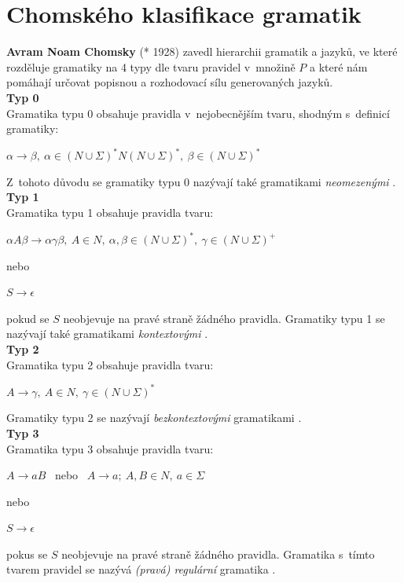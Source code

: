 \section{Chomského klasifikace gramatik} \label{sec:2:chomsky}
\textbf{Avram Noam Chomsky} (* 1928) zavedl hierarchii gramatik a jazyků, ve které rozděluje gramatiky na 4 typy dle tvaru pravidel v~množině 
$P$ a které nám pomáhají určovat popisnou a rozhodovací sílu generovaných jazyků. \\

\textbf{Typ 0} \\
Gramatika typu 0 obsahuje pravidla v~nejobecnějším tvaru, shodným s~definicí gramatiky:
\begin{center}
$\alpha \rightarrow \beta, \ \alpha \in (N \cup \Sigma)^*N(N \cup \Sigma)^*, \ \beta \in (N \cup \Sigma)^*$
\end{center}
Z~tohoto důvodu se gramatiky typu 0 nazývají také gramatikami \textit{neomezenými} \cite[str. 16]{TIN2013}. \\
\newpage
\textbf{Typ 1} \\
Gramatika typu 1 obsahuje pravidla tvaru:
\begin{center}
$ \alpha A \beta \rightarrow \alpha\gamma\beta, \ A \in N, \ \alpha, \beta \in (N \cup \Sigma)^*, \ \gamma \in (N \cup \Sigma)^+$ 
\end{center}
nebo
\begin{center}
$ S \rightarrow \epsilon$ 
\end{center}
pokud se $S$ neobjevuje na pravé straně žádného pravidla. Gramatiky typu 1 se nazývají také gramatikami 
\textit{kontextovými} \cite[str. 16]{TIN2013}. \\

\textbf{Typ 2} \\
Gramatika typu 2 obsahuje pravidla tvaru:
\begin{center}
$ A \rightarrow \gamma, \ A \in N, \ \gamma \in (N \cup \Sigma)^*$
\end{center}
Gramatiky typu 2 se nazývají \textit{bezkontextovými} gramatikami \cite[str. 17]{TIN2013}. \\

\textbf{Typ 3} \\
Gramatika typu 3 obsahuje pravidla tvaru:
\begin{center}
$ A \rightarrow aB$ \ nebo \ $A \rightarrow a; \ A,B \in N, \ a \in \Sigma$
\end{center}
nebo
\begin{center}
$ S \rightarrow \epsilon$
\end{center}
pokus se $S$ neobjevuje na pravé straně žádného pravidla. Gramatika s~tímto tvarem pravidel se nazývá \textit{(pravá) regulární} 
gramatika \cite[str. 17]{TIN2013}. \\

